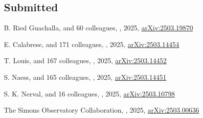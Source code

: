 

\subsection*{Submitted}

\begin{etaremune}

\item
B. Ried Guachalla, and 60 colleagues,
,
2025, \href{https://ui.adsabs.harvard.edu/abs/2025arXiv250319870R}{arXiv:2503.19870}
\submitted{\prd}

\item
E. Calabrese, and 171 colleagues,
,
2025, \href{https://ui.adsabs.harvard.edu/abs/2025arXiv250314454C}{arXiv:2503.14454}
\submitted{\jcap}

\item
T. Louis, and 167 colleagues,
,
2025, \href{https://ui.adsabs.harvard.edu/abs/2025arXiv250314452L}{arXiv:2503.14452}
\submitted{\jcap}

\item
S. Naess, and 165 colleagues,
,
2025, \href{https://ui.adsabs.harvard.edu/abs/2025arXiv250314451N}{arXiv:2503.14451}
\submitted{\jcap}

\item
S. K. Nerval, and 16 colleagues,
,
2025, \href{https://ui.adsabs.harvard.edu/abs/2025arXiv250310798N}{arXiv:2503.10798}
\submitted{\apj}

\item
The Simons Observatory Collaboration,
,
2025, \href{https://ui.adsabs.harvard.edu/abs/2025arXiv250300636A}{arXiv:2503.00636}
\submitted{\jcap}


\end{etaremune}

